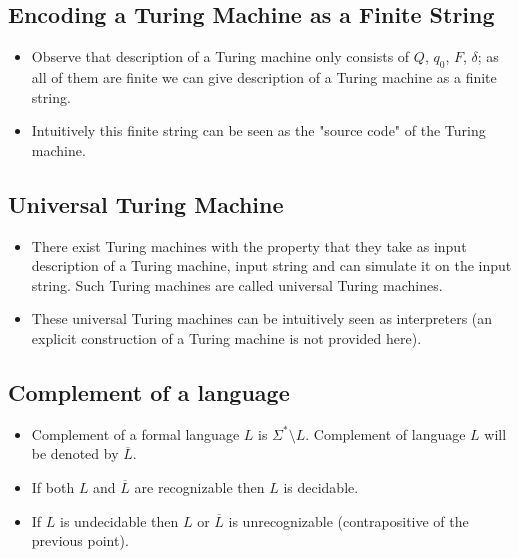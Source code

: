 \documentclass[
11pt,notheorems,hyperref={pdfauthor=whatever}
]{beamer}
\begin{document}
\subsection{Encoding a Turing Machine as a Finite String}
\begin{frame}
\begin{itemize}
    \setlength\itemsep{3em}
    \item Observe that description of a Turing machine only consists of $Q$, $q_0$, $F$, $\delta$; as all of them are finite we can give description of a Turing machine as a finite string.
    \item Intuitively this finite string can be seen as the "source code" of the Turing machine.
\end{itemize}
\end{frame}

\subsection{Universal Turing Machine}
\begin{frame}
\begin{itemize}
    \setlength\itemsep{3em}
    \item There exist Turing machines with the property that they take as input description of a Turing machine, input string and can simulate it on the input string. Such Turing machines are called universal Turing machines.
    \item These universal Turing machines can be intuitively seen as interpreters (an explicit construction of a Turing machine is not provided here).
\end{itemize}
\end{frame}

\subsection{Complement of a language}
\begin{frame}
\begin{itemize}
    \setlength\itemsep{3em}
    \item Complement of a formal language $L$ is $\Sigma^* \setminus L$. Complement of language $L$ will be denoted by $\overline{L}$.
    \item If both $L$ and $\overline{L}$ are recognizable then $L$ is decidable.
    \item If $L$ is undecidable then $L$ or $\overline{L}$ is unrecognizable (contrapositive of the previous point).
\end{itemize}
\end{frame}
\end{document}

